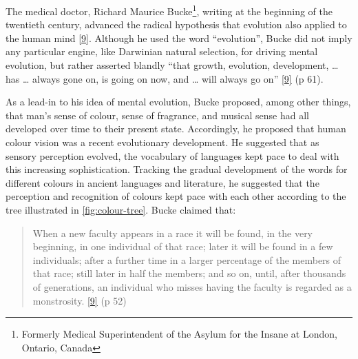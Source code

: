 \documentclass[
  a4paper,
]{article}
\begin{document}
The medical doctor, Richard Maurice Bucke\footnote{Formerly Medical
  Superintendent of the Asylum for the Insane at London, Ontario, Canada},
writing at the beginning of the twentieth century, advanced the radical
hypothesis that evolution also applied to the human mind
\protect\hyperlink{ref-bucke48}{{[}9{]}}. Although he used the word
``evolution'', Bucke did not imply any particular engine, like Darwinian
natural selection, for driving mental evolution, but rather asserted
blandly ``that growth, evolution, development, \ldots{} has \ldots{}
always gone on, is going on now, and \ldots{} will always go on''
\protect\hyperlink{ref-bucke48}{{[}9{]}} (p 61).

As a lead-in to his idea of mental evolution, Bucke proposed, among
other things, that man's sense of colour, sense of fragrance, and
musical sense had all developed over time to their present state.
Accordingly, he proposed that human colour vision was a recent
evolutionary development. He suggested that as sensory perception
evolved, the vocabulary of languages kept pace to deal with this
increasing sophistication. Tracking the gradual development of the words
for different colours in ancient languages and literature, he suggested
that the perception and recognition of colours kept pace with each other
according to the tree illustrated in \cref{fig:colour-tree}. Bucke
claimed that:

\begin{quote}
When a new faculty appears in a race it will be found, in the very
beginning, in one individual of that race; later it will be found in a
few individuals; after a further time in a larger percentage of the
members of that race; still later in half the members; and so on, until,
after thousands of generations, an individual who misses having the
faculty is regarded as a monstrosity.
\protect\hyperlink{ref-bucke48}{{[}9{]}} (p 52)
\end{quote}
\end{document}
